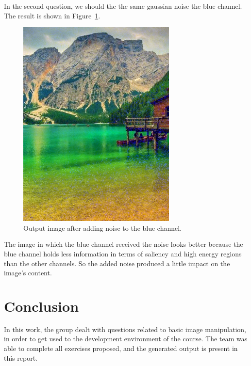 \documentclass[]{IEEEtran}
\begin{document}
  In the second question, we should the the same gaussian noise the blue channel. The result is shown in Figure~\ref{fig:o-5-b-0}.
  
   \begin{figure}[!h]
    \centering
    \includegraphics[width=0.8\hsize]{../output/o-5-b-0.jpg}
    \caption{Output image after adding noise to the blue channel.}
    \label{fig:o-5-b-0}
  \end{figure}
  
  The image in which the blue channel received the noise looks better because the blue channel holds less information in terms of saliency and high energy regions than the other channels. So the added noise produced a little impact on the image's content.
  
  
  \section{Conclusion}
  
  In this work, the group dealt with questions related to basic image manipulation, in order to get used to the development environment of the course. The team was able to complete all exercises proposed, and the generated output is present in this report.
\end{document}
